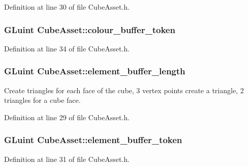 Definition at line 30 of file Cube\+Asset.\+h.

\hypertarget{class_cube_asset_a75f98d346175cd91cdee04f1885f5327}{}
\subsubsection[{colour\+\_\+buffer\+\_\+token}]{\setlength{\rightskip}{0pt plus 5cm}G\+Luint Cube\+Asset\+::colour\+\_\+buffer\+\_\+token\hspace{0.3cm}{\ttfamily [private]}}\label{class_cube_asset_a75f98d346175cd91cdee04f1885f5327}


Definition at line 34 of file Cube\+Asset.\+h.

\hypertarget{class_cube_asset_ac66c2ec869f392515dad4ebda1fe4792}{}
\subsubsection[{element\+\_\+buffer\+\_\+length}]{\setlength{\rightskip}{0pt plus 5cm}G\+Luint Cube\+Asset\+::element\+\_\+buffer\+\_\+length\hspace{0.3cm}{\ttfamily [private]}}\label{class_cube_asset_ac66c2ec869f392515dad4ebda1fe4792}
Create triangles for each face of the cube, 3 vertex points create a triangle, 2 triangles for a cube face. 

Definition at line 29 of file Cube\+Asset.\+h.

\hypertarget{class_cube_asset_a4fae699256e7c5633a8174a93ca8a0ec}{}
\subsubsection[{element\+\_\+buffer\+\_\+token}]{\setlength{\rightskip}{0pt plus 5cm}G\+Luint Cube\+Asset\+::element\+\_\+buffer\+\_\+token\hspace{0.3cm}{\ttfamily [private]}}\label{class_cube_asset_a4fae699256e7c5633a8174a93ca8a0ec}


Definition at line 31 of file Cube\+Asset.\+h.

